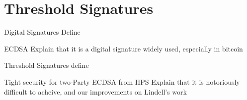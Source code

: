 \documentclass[10pt]{beamer}
\begin{document}
\section{Threshold Signatures}
\begin{frame}{Digital Signatures}
Define
\end{frame}
\begin{frame}{ECDSA}
Explain that it is a digital signature widely used, especially in bitcoin
\end{frame}
\begin{frame}{Threshold Signatures}
define
\end{frame}
\begin{frame}{Tight security for two-Party ECDSA from HPS}
Explain that it is notoriously difficult to acheive, and our improvements on Lindell's work
\end{frame}
\end{document}
